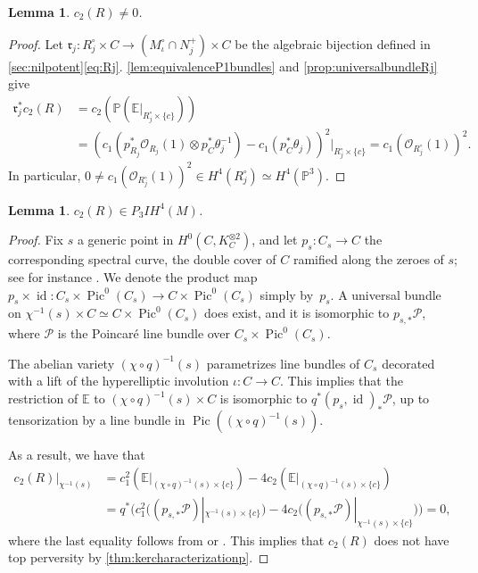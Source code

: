 \documentclass[JEP,XML,SOM,Unicode, NoEqCountersInSection,NoFloatCountersInSection,published]{cedram}
\let\mathcal\mathscr
\newcommand{\IH}{\mathit{IH}}
\newtheorem{lem}[thm]{Lemma}
\theoremstyle{definition}
\newcommand{\PP}{\mathbb{P}}
\newcommand{\id}{\operatorname{id}}
\newcommand{\Pic}{\operatorname{Pic}}
\let\NBun N
\let\Rcomp R
\let\Runi R
\begin{document}
\begin{lem}
\label{lem:c2neqzero}$c_2(\Runi) \neq 0$.
\end{lem}
\begin{proof}
Let $\mathfrak{r}_j\colon\Rcomp^{\circ}_j \times C \to (M^{\circ}_{\iota} \cap \NBun^{+}_j) \times C$ be the algebraic bijection defined in \ref{sec:nilpotent}\eqref{eq:Rj}. \cref{lem:equivalenceP1bundles} and \cref{prop:universalbundleRj} give
\begin{align*}
\mathfrak{r}^*_j c_2(\Runi) & = c_2(\PP(\mathbb{E}|_{\Rcomp^{\circ}_j \times \{c\}})) \\
& = (c_1(p_{\Rcomp_j}^* \mathcal{O}_{\Rcomp_j}(1)\otimes p_C^*\theta^{-1}_j) - c_1(p_C^*\theta_j))^2|_{\Rcomp^{\circ}_j \times \{c\}}= c_1(\mathcal{O}_{\Rcomp^{\circ}_j}(1))^2.
\end{align*}
In particular, $0 \neq c_1(\mathcal{O}_{\Rcomp^{\circ}_j}(1))^2 \in H^4(\Rcomp^{\circ}_j) \simeq H^4(\PP^3)$.
\end{proof}

\begin{lem}\label{lem:c2Rperversity3}
$c_2(\Runi) \in P_3 \IH^4(M)$.
\end{lem}
\begin{proof}
Fix $s$ a generic point in $H^0(C, K_C^{\otimes 2})$, and let $p_s \colon C_s \to C$ the corresponding spectral curve, \ie the double cover of $C$ ramified along the zeroes of $s$; see for instance \cite[\S 3]{BNR89}. We denote the product map $p_s \times \id\colon C_s \times \Pic^0(C_s)\to C \times \Pic^0(C_s)$ simply by~$p_s$. A universal bundle on $\chi^{-1}(s) \times C \simeq C \times \Pic^0(C_s)$ does exist, and it is isomorphic to $p_{s, *} \mathcal{P}$, where $\mathcal{P}$ is the Poincaré line bundle over $C_s \times \Pic^0(C_s)$.

The abelian variety $(\chi \circ q)^{-1}(s)$ parametrizes line bundles of $C_s$ decorated with a lift of the hyperelliptic involution $\iota\colon C \to C$. This implies that the restriction of $\mathbb{E}$ to $(\chi \circ q)^{-1}(s) \times C$ is isomorphic to $q^* (p_{s}, \id)_* \mathcal{P}$, up to tensorization by a line bundle in $\Pic((\chi \circ q)^{-1}(s))$.

As a result, we have that
\begin{align*}
c_2(\Runi)|_{\chi^{-1}(s)} & = c^2_1(\mathbb{E}|_{(\chi \circ q)^{-1}(s) \times \{c\}})-4c_2(\mathbb{E}|_{(\chi \circ q)^{-1}(s) \times \{c\}})\\
& = q^*\Big(c^2_1\big((p_{s,*} \mathcal{P})|_{\chi ^{-1}(s) \times \{c\}}\big) - 4c_2\big((p_{s,*} \mathcal{P})|_{\chi ^{-1}(s) \times \{c\}}\big)\Big)=0,
\end{align*}
where the last equality follows from \cite[\S 4]{Thaddeus89} or \cite[Eq.\,(5.1.10) \& (5.1.11)]{deCataldoHauselMigliorini2012}.
This implies that $c_2(\Runi)$ does not have top perversity by \cref{thm:kercharacterizationp}.
\end{proof}
\end{document}
